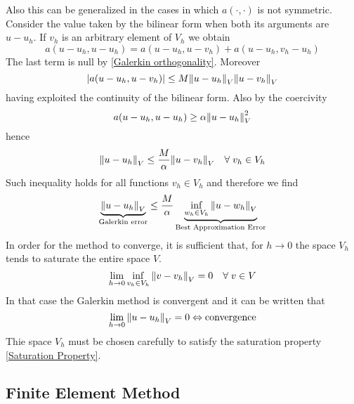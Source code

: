 Also this can be generalized in the cases in which \(a(\cdot, \cdot)\) is not symmetric. Consider the value taken by the bilinear form when both its arguments are \(u-u_h\). If \(v_h\) is an arbitrary element of \(V_h\) we obtain 
\[
    a(u-u_h, u-u_h) = a(u-u_h, u-v_h) + a(u-u_h, v_h-u_h)
\]
The last term is null by \eqref{Galerkin orthogonality}. Moreover 
\[
    \abs{a(u-u_h, u-v_h)} \leq M \norm{u-u_h}_V\norm{u-v_h}_V
\]
having exploited the continuity of the bilinear form. Also by the coercivity 
\[
    a(u-u_h, u-u_h) \geq \alpha \norm{u-u_h}^2_V
\]
hence 
\[
    \norm{u-u_h}_V \leq \frac{M}{\alpha} \norm{u-v_h}_V \quad \forall \; v_h \in V_h
\]
Such inequality holds for all functions \(v_h \in V_h\) and therefore we find 
\begin{equation}
   \underbrace{ \norm{u-u_h}_V}_{\text{Galerkin error}} \leq \frac{M}{\alpha} \underbrace{\inf_{w_h \in V_h} \norm{u - w_h}_V}_{\text{Best Approximation Error}} \label{Ceà Lemma}
\end{equation}
In order for the method to converge, it is sufficient that, for \(h \to 0\) the space \(V_h\) tends to saturate the entire space \(V\). 
\begin{equation}
    \lim_{h \to 0} \inf_{v_h \in V_h} \norm{v-v_h}_V= 0 \quad \forall \; v \in V \label{Saturation Property}
\end{equation}
In that case the Galerkin method is convergent and it can be written that
\[
    \lim_{h\to 0} \norm{u-u_h}_V = 0 \Leftrightarrow \text{convergence}
\]
Thie space \(V_h\) must be chosen carefully to satisfy the saturation property \eqref{Saturation Property}.
\subsection{Finite Element Method}
